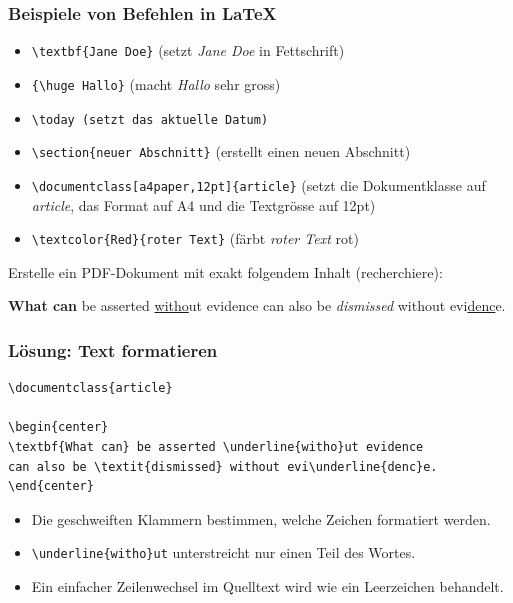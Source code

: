 \begin{frame}[fragile]
\frametitle{Beispiele von Befehlen in \LaTeX}
\begin{itemize}[<+->]
    \item \lstinline[style=LaTeX]|\textbf{Jane Doe}| (setzt \textit{Jane Doe} in Fettschrift)
    \item \lstinline[style=LaTeX]|{\huge Hallo}| (macht \textit{Hallo} sehr gross)
    \item \lstinline[style=LaTeX]|\today (setzt das aktuelle Datum)|
    \item \lstinline[style=LaTeX]|\section{neuer Abschnitt}| (erstellt einen neuen Abschnitt)
    \item \lstinline[style=LaTeX]|\documentclass[a4paper,12pt]{article}| {\small (setzt die Dokumentklasse auf \textit{article}, das Format auf A4 und die Textgrösse auf 12pt)}
    \item \lstinline|\textcolor{Red}{roter Text}| {\small (färbt \textit{roter Text} rot)}
\end{itemize}
\end{frame}

\begin{frame}[fragile]
\begin{myexercise}\label{myexercise:hitchens-razor}
    Erstelle ein PDF-Dokument mit exakt folgendem Inhalt (recherchiere):
    
        \begin{center}
            \textbf{What can} be asserted \underline{witho}ut evidence can also be \textit{dismissed} without evi\underline{denc}e.
        \end{center}
\end{myexercise}
\end{frame}

\begin{frame}[fragile]
\frametitle{Lösung: Text formatieren}
\begin{lstlisting}[style=LaTeX, basicstyle=\footnotesize\ttfamily]
\documentclass{article}

\begin{center}
\textbf{What can} be asserted \underline{witho}ut evidence
can also be \textit{dismissed} without evi\underline{denc}e.
\end{center}

\end{lstlisting}
\begin{itemize}
    \item Die geschweiften Klammern bestimmen, welche Zeichen formatiert werden.
    \item \lstinline[style=LaTeX]|\underline{witho}ut| unterstreicht nur einen Teil des Wortes.
    \item Ein einfacher Zeilenwechsel im Quelltext wird wie ein Leerzeichen behandelt.
\end{itemize}
\end{frame}


